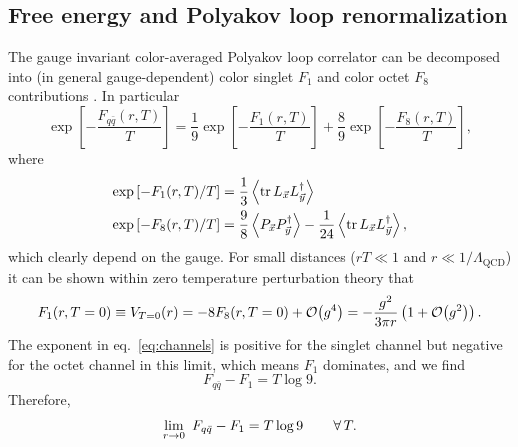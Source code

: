 \subsection{Free energy and Polyakov loop renormalization}
The gauge invariant color-averaged Polyakov loop correlator can be decomposed
into (in general gauge-dependent) color singlet $F_1$ and color octet $F_8$
contributions
\cite{mclerran_monte_1981,mclerran_quark_1981,nadkarni_non-abelian_1986}.
In particular
\begin{equation}\label{eq:channels}
  \exp\left[-\frac{F_{q\bar{q}}(r,T)}{T}\right]
  =\frac{1}{9}\exp\left[-\frac{F_1(r,T)}{T}\right]
   +\frac{8}{9}\exp\left[-\frac{F_8(r,T)}{T}\right],
\end{equation}
where
\begin{equation}\begin{aligned}
 \exp\left[-F_1(r,T)/T\right]
   &=\frac{1}{3}\ev{\tr L_{\vec{x}}L^\dagger_{\vec{y}}}\\
  \exp\left[-F_8(r,T)/T\right]
    &=\frac{9}{8}\ev{P_{\vec{x}}P^\dagger_{\vec{y}}}
     -\frac{1}{24}\ev{\tr L_{\vec{x}}L^\dagger_{\vec{y}}},
\end{aligned}\end{equation}
which clearly depend on the gauge.
For small distances ($rT\ll1$ and $r\ll1/\Lambda_{\text{QCD}}$) it can
be shown within zero temperature perturbation theory
\cite{kaczmarek_heavy_2002} that
\begin{equation}\label{eq:Fperturb}\begin{aligned}
  F_1(r,T=0)\equiv V_{T=0}(r)
            =-8F_8(r,T=0)+\order{g^4}
            =-\frac{g^2}{3\pi r}\left(1+\order{g^2}\right).
\end{aligned}\end{equation}
The exponent in eq.~\eqref{eq:channels} is positive for the singlet channel
but negative for the octet channel in this limit, which means $F_1$ dominates,
and we find
\begin{equation}
  F_{q\bar{q}}-F_1=T\log 9.
\end{equation}
Therefore,
\begin{equation}\label{eq:Tlog9}
  \lim_{r\to0}~F_{q\bar{q}}-F_1=T\log 9\qquad\operatorname{\forall} T.
\end{equation}

